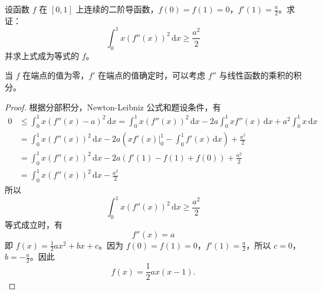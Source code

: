 \documentclass[../../main.tex]{subfiles}
\begin{document}
\begin{example}
设函数 \( f \) 在 \([0,1]\) 上连续的二阶导函数，\( f(0) = f(1) = 0 \)，\( f'(1) = \frac{a}{2} \)。求证：
\[
\int_{0}^{1} x(f''(x))^2 \, \mathrm{d}x \geqslant \frac{a^2}{2}
\]
并求上式成为等式的 \( f \)。
\end{example}
\begin{remark}
当 \( f \) 在端点的值为零，\( f' \) 在端点的值确定时，可以考虑 \( f'' \) 与线性函数的乘积的积分。
\end{remark}
\begin{proof}
根据分部积分，Newton-Leibniz 公式和题设条件，有
\begin{align*}
0 &\leqslant \int_{0}^{1} x(f''(x) - a)^2 \, \mathrm{d}x = \int_{0}^{1} x(f''(x))^2 \, \mathrm{d}x - 2a \int_{0}^{1} x f''(x) \, \mathrm{d}x + a^2 \int_{0}^{1} x \, \mathrm{d}x \\
&= \int_{0}^{1} x(f''(x))^2 \, \mathrm{d}x - 2a \left( x f'(x)\big|_{0}^{1} - \int_{0}^{1} f'(x) \, \mathrm{d}x \right) + \frac{a^2}{2} \\
&= \int_{0}^{1} x(f''(x))^2 \, \mathrm{d}x - 2a \left( f'(1) - f(1) + f(0) \right) + \frac{a^2}{2} \\
&= \int_{0}^{1} x(f''(x))^2 \, \mathrm{d}x - \frac{a^2}{2}
\end{align*}
所以
\[
\int_{0}^{1} x(f''(x))^2 \, \mathrm{d}x \geqslant \frac{a^2}{2}
\]
等式成立时，有
\[
f''(x) = a
\]
即 \( f(x) = \frac{1}{2} a x^2 + b x + c \)。因为 \( f(0) = f(1) = 0 \)，\( f'(1) = \frac{a}{2} \)，所以 \( c = 0 \)，\( b = -\frac{a}{2} \)。因此
\[
f(x) = \frac{1}{2} a x(x - 1).
\]
\end{proof}
\end{document}
